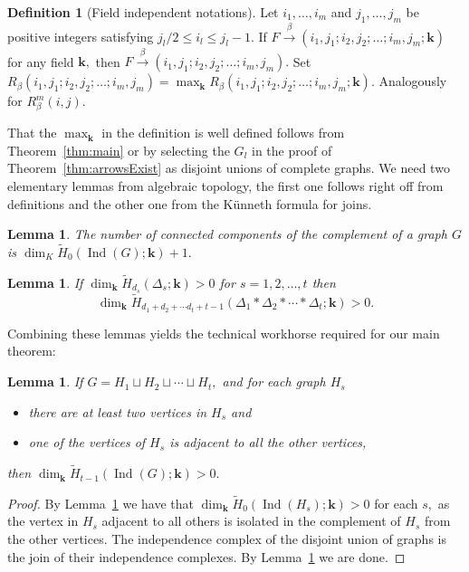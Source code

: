 \documentclass{article}
\theoremstyle{plain}
\newtheorem{lem}[thm]{Lemma}
\theoremstyle{definition}
\newtheorem{defn}{Definition}
\begin{document}
\begin{defn}[Field independent notations] Let $i_1,\ldots,i_m$ and $j_1,\ldots, j_m$ be positive integers satisfying $j_l/2 \leq i_l \leq j_l-1.$ If
$ F \xrightarrow{\beta} (i_1,j_1;i_2,j_2;\ldots;i_m,j_m; \mathbf{k}) $ for any field $\mathbf{k},$ then $ F \xrightarrow{\beta} (i_1,j_1;i_2,j_2;\ldots;i_m,j_m).$
Set $R_\beta (i_1,j_1;i_2,j_2;\ldots;i_m,j_m) = \max_{\mathbf{k}} R_\beta (i_1,j_1;i_2,j_2;\ldots;i_m,j_m; \mathbf{k}).$ Analogously for $R_\beta^m (i,j).$
\end{defn}

That the $\max_{\mathbf{k}}$ in the definition is well defined follows from Theorem~\ref{thm:main} or by selecting the $G_l$ in the proof of Theorem~\ref{thm:arrowsExist} as disjoint unions of complete graphs.
We need two elementary lemmas from algebraic topology, the first one follows right off from definitions and the other one from the K\"unneth formula for joins.
\begin{lem}\label{lem:compH0} 
The number of connected components of the complement of a graph $G$ is $\dim_K  \widetilde{H}_0(  \operatorname{Ind}(G) ; \mathbf{k} )+1.$
\end{lem}
\begin{lem}\label{lem:join} 
If $ \dim_{\mathbf{k} }  \widetilde{H}_{d_s}(\Delta_s; {\mathbf{k} }) >0$ for $s=1,2,\ldots,t$ then
\[ \dim_{\mathbf{k} }  \widetilde{H}_{d_1 + d_2 + \cdots d_t + t-1}(\Delta_1 \ast \Delta_2 \ast \cdots \ast \Delta_t; {\mathbf{k} }) >0.\]
\end{lem}
Combining these lemmas yields the technical workhorse required for our main theorem:
\begin{lem}\label{lem:horse} If $G=H_1\sqcup H_2 \sqcup \cdots \sqcup H_t,$ and for each graph $H_s$ 
\begin{itemize}
\item[-] there are at least two vertices in $H_s$ and
\item[-] one of the vertices of $H_s$ is adjacent to all the other vertices,
\end{itemize}
then $\dim_{\mathbf{k} }  \widetilde{H}_{t-1}(  \operatorname{Ind}(G) ; {\mathbf{k} } )>0.$
\end{lem}
\begin{proof}
By Lemma~\ref{lem:compH0} we have that
$\dim_{\mathbf{k} }  \widetilde{H}_{0}(  \operatorname{Ind}(H_s) ; {\mathbf{k} } )>0$ for each $s,$ as the vertex in $H_s$ adjacent to all others is isolated in the complement of $H_s$ from the other vertices. The independence complex of the disjoint union of graphs is the join of their independence complexes. By Lemma~\ref{lem:join} we are done.
\end{proof}
\end{document}

